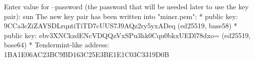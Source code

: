 \begin{shellbox}\begin{ttlst}
Enter value for --password (the password that will be needed later to use the key pair): sun
The new key pair has been written into "miner.pem":
* public key: 9CCa3cZiZAYSDLrqntiTiTD7cUUS7J9AQz2ry5yxADeq (ed25519, base58)
* public key: ebv3XNCkzdENcVDQQzVxSPu3hk0Cqu0bkxUEDl78dxo= (ed25519, base64)
* Tendermint-like address: 1BA1E06AC23BC9BD163C25E3BE1E1C03C3319D0B
\end{ttlst}\end{shellbox}
